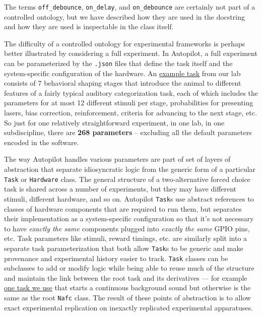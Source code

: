 \documentclass[10pt]{tufte-book}
\begin{document}
The terms \texttt{off\_debounce}, \texttt{on\_delay}, and
\texttt{on\_debounce} are certainly not part of a controlled ontology,
but we have described how they are used in the docstring and how they
are used is inspectable in the class itself.

The difficulty of a controlled ontology for experimental frameworks is
perhaps better illustrated by considering a full experiment. In
Autopilot, a full experiment can be parameterized by the \texttt{.json}
files that define the task itself and the system-specific configuration
of the hardware. An
\href{https://gist.github.com/sneakers-the-rat/eebe675326a157df49f66f62c4e33a6e}{example
task} from our lab consists of 7 behavioral shaping stages that
introduce the animal to different features of a fairly typical auditory
categorization task, each of which includes the parameters for at most
12 different stimuli per stage, probabilities for presenting lasers,
bias correction, reinforcement, criteria for advancing to the next
stage, etc. So just for one relatively straightforward experiment, in
one lab, in one subdiscipline, there are \textbf{268 parameters} --
excluding all the default parameters encoded in the software.

The way Autopilot handles various parameters are part of set of layers
of abstraction that separate idiosyncratic logic from the generic form
of a particular \texttt{Task} or \texttt{Hardware} class. The general
structure of a two-alternative forced choice task is shared across a
number of experiments, but they may have different stimuli, different
hardware, and so on. Autopilot \texttt{Task}s use abstract references to
classes of hardware components that are required to run them, but
separates their implementation as a system-specific configuration so
that it's not necessary to have \emph{exactly the same} components
plugged into \emph{exactly the same} GPIO pins, etc. Task parameters
like stimuli, reward timings, etc. are similarly split into a separate
task parameterization that both allow \texttt{Task}s to be generic and
make provenance and experimental history easier to track. \texttt{Task}
classes can be subclasses to add or modify logic while being able to
reuse much of the structure and maintain the link between the root task
and its derivatives --- for example
\href{https://github.com/auto-pi-lot/autopilot-plugin-wehrlab/blob/9cfffcf5fe1886d25658d4f1f0c0ffe41c18e2cc/gap/nafc_gap.py\#L13-L49}{one
task we use} that starts a continuous background sound but otherwise is
the same as the root \texttt{Nafc} class. The result of these points of
abstraction is to allow exact experimental replication on inexactly
replicated experimental apparatuses.
\end{document}
